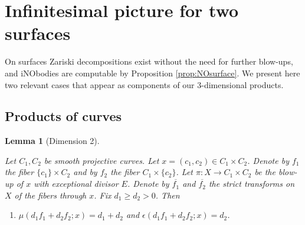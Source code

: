 \documentclass[12pt]{amsart}
\newtheorem{lemma}{Lemma}[section]
\theoremstyle{definition}
\newcommand{\RR}{\ensuremath{\mathbb{R}}}
\newcommand{\sO}{\ensuremath{\mathscr{O}}}
\renewcommand{\geq}{\geqslant}
\renewcommand{\leq}{\leqslant}
\DeclareMathOperator{\mult}{mult}
\newcommand{\?}{ \circled{{\large\bf ?}}}
\begin{document}
\section{Infinitesimal picture for two surfaces}

On surfaces Zariski decompositions exist without the need for further blow-ups, and iNObodies are computable by Proposition \ref{prop:NOsurface}. We present here two relevant cases that appear as components of our 3-dimensional products.

\subsection{Products of curves} 


\begin{lemma}[Dimension 2]\label{lem:twoelliptic}
	
	
	
	Let $C_1,C_2$ be smooth projective curves. Let $x=(c_1,c_2)\in C_1\times C_2$. Denote by $f_1$ the fiber $\{c_1\}\times C_2$ and by $f_2$ the fiber $C_1\times\{c_2\}$. Let $\pi:X\to C_1\times C_2$ be the blow-up of $x$ with exceptional divisor $E$. Denote by $\overline{f_1}$ and $\overline{f_2}$ the strict transforms on $X$ of the fibers through $x$. Fix $d_1\geq d_2> 0$. 
	Then 
	\begin{enumerate}
		\item $\mu(d_1f_1+d_2f_2;x)=d_1+d_2$ and $\epsilon(d_1f_1+d_2f_2;x)=d_2$.
		\smallskip
		

\end{enumerate}
\end{lemma}
\end{document}
